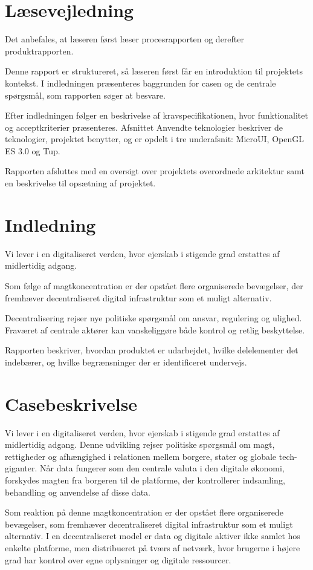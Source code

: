 \documentclass{article}
\begin{document}
\section{Læsevejledning}
Det anbefales, at læseren først læser procesrapporten og derefter produktrapporten.

Denne rapport er struktureret, så læseren først får en introduktion til
projektets kontekst. I indledningen præsenteres baggrunden for casen
og de centrale spørgsmål, som rapporten søger at besvare.

Efter indledningen følger en beskrivelse af kravspecifikationen, hvor
funktionalitet og acceptkriterier præsenteres. Afsnittet
Anvendte teknologier beskriver de teknologier, projektet benytter,
og er opdelt i tre underafsnit: MicroUI, OpenGL ES 3.0 og Tup.

Rapporten afsluttes med en oversigt over projektets overordnede arkitektur
samt en beskrivelse til opsætning af projektet.

\section{Indledning}
Vi lever i en digitaliseret verden, hvor ejerskab i stigende grad erstattes af
midlertidig adgang.

Som følge af magtkoncentration er der opstået flere organiserede bevægelser, der
fremhæver decentraliseret digital infrastruktur som et muligt alternativ.

Decentralisering rejser nye politiske spørgsmål om ansvar, regulering og ulighed.
Fraværet af centrale aktører kan vanskeliggøre både kontrol og retlig beskyttelse.

Rapporten beskriver, hvordan produktet er udarbejdet, hvilke delelementer det
indebærer, og hvilke begrænsninger der er identificeret undervejs.

\section{Casebeskrivelse}
Vi lever i en digitaliseret verden, hvor ejerskab i stigende grad
erstattes af midlertidig adgang. Denne udvikling rejser politiske
spørgsmål om magt, rettigheder og afhængighed i relationen mellem
borgere, stater og globale tech-giganter. Når data fungerer som den
centrale valuta i den digitale økonomi, forskydes magten fra borgeren
til de platforme, der kontrollerer indsamling, behandling og
anvendelse af disse data.

Som reaktion på denne magtkoncentration er der opstået flere
organiserede bevægelser, som fremhæver decentraliseret digital
infrastruktur som et muligt alternativ. I en decentraliseret model
er data og digitale aktiver ikke samlet hos enkelte platforme, men
distribueret på tværs af netværk, hvor brugerne i højere grad 
har kontrol over egne oplysninger og digitale ressourcer.
\end{document}
